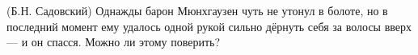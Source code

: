 (Б.Н. Садовский)
Однажды барон Мюнхгаузен чуть не утонул в болоте, но в последний момент
ему удалось одной рукой сильно дёрнуть себя за волосы вверх --- и
он спасся. Можно ли этому поверить?
